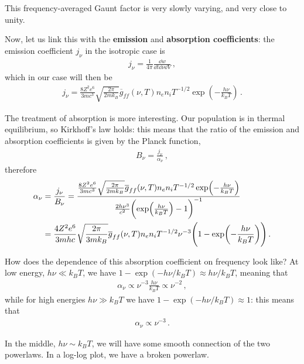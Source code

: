 \documentclass[main.tex]{subfiles}
\begin{document}
This frequency-averaged Gaunt factor is very slowly varying, and very close to unity. 

Now, let us link this with the \textbf{emission} and \textbf{absorption coefficients}: the emission coefficient \(j_\nu \) in the isotropic case is  
%
\begin{align}
j_\nu = \frac{1}{4\pi } \frac{ \dd{w}}{ \dd{t} \dd{\nu } \dd{V}}
\,,
\end{align}
%
which in our case will then be 
%
\begin{align}
j_\nu = \frac{8 Z^2 e^{6}}{3 m c^3} \sqrt{ \frac{2 \pi }{2 m k_B}}
\overline{g}_{ff}(\nu, T) n_e n_i T^{-1/2 } \exp(- \frac{h \nu }{k_B T})
\,.
\end{align}

The treatment of absorption is more interesting. Our population  is in thermal equilibrium, so Kirkhoff's law holds: this means that the ratio of the emission and absorption coefficients is given by the Planck function, 
%
\begin{align}
B_\nu = \frac{j_\nu }{\alpha_{\nu }}
\,,
\end{align}
%
therefore 
%
\begin{align}
\alpha_{\nu } &= \frac{j_\nu }{B_\nu } 
= \frac{\frac{8 Z^2 e^{6}}{3 m c^3} \sqrt{ \frac{2 \pi }{2 m k_B}}
\overline{g}_{ff}(\nu, T) n_e n_i T^{-1/2 } \exp(- \frac{h \nu }{k_B T})}{\frac{2 h \nu^3}{c^2} \qty(\exp( \frac{h \nu }{k_B T}) -1)^{-1}}  \\
&= \frac{4 Z^2 e^{6}}{3 m h c} \sqrt{\frac{2 \pi }{3 m k_B}} \overline{g}_{ff} (\nu, T) n_e n_i T^{-1/2} \nu^{-3} \qty(1 - \exp(- \frac{h \nu }{k_B T}))
\,.
\end{align}

How does the dependence of this absorption coefficient on frequency look like? At low energy, \(h \nu \ll k_B T\), we have \(1 - \exp(- h \nu / k_B T) \approx h \nu / k_B T\), meaning that 
%
\begin{align}
\alpha_{\nu } \propto \nu^{-3} \frac{h \nu }{k_B T} \propto \nu^{-2}
\,,
\end{align}
%
while for high energies \(h \nu \gg k_B T\) we have \(1 - \exp(- h \nu / k_B T) \approx 1\): this means that 
%
\begin{align}
\alpha_{\nu } \propto \nu^{-3}
\,.
\end{align}

In the middle, \(h \nu \sim k_B T\), we will have some smooth connection of the two powerlaws. 
In a log-log plot, we have a broken powerlaw. 
\end{document}
